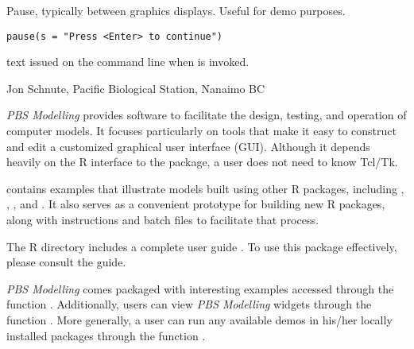 \documentclass[letterpaper]{book}
\begin{document}
\begin{Description}\relax
Pause, typically between graphics displays. Useful for demo purposes.
\end{Description}
\begin{Usage}
\begin{verbatim}
pause(s = "Press <Enter> to continue")
\end{verbatim}
\end{Usage}
\begin{Arguments}
\begin{ldescription}
\item[\code{s}] text issued on the command line when  is invoked.
\end{ldescription}
\end{Arguments}
\begin{Author}\relax
Jon Schnute, Pacific Biological Station, Nanaimo BC
\end{Author}

\begin{Description}\relax
\emph{PBS Modelling} provides software to facilitate the design, 
testing, and operation of computer models. It focuses particularly on 
tools that make it easy to construct and edit a customized graphical 
user interface (GUI). Although it depends heavily on the R interface 
to the  package, a user does not need to know Tcl/Tk. 

 contains examples that illustrate models built using 
other R packages, including , , 
, and . 
It also serves as a convenient prototype for building new R packages, 
along with instructions and batch files to facilitate that process.

The R directory  includes a complete 
user guide . To use this package effectively, 
please consult the guide.

\emph{PBS Modelling} comes packaged with interesting examples accessed 
through the function .
Additionally, users can view \emph{PBS Modelling} widgets through the 
function . 
More generally, a user can run any available demos in his/her locally 
installed packages through the function .
\end{Description}
\end{document}
